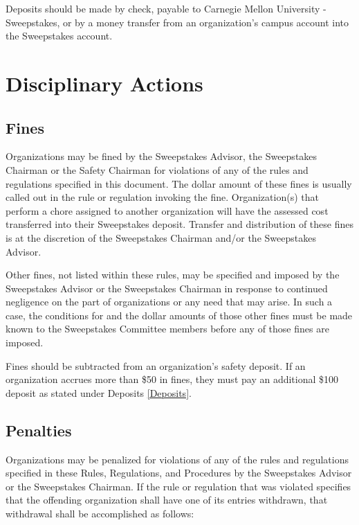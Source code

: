 	Deposits should be made by check, payable to Carnegie Mellon University - Sweepstakes, or by a money transfer from an organization's campus account into the Sweepstakes account.

\section{Disciplinary Actions}
\label{sec:DiciplinaryActions}

\subsection{Fines}

	Organizations may be fined by the Sweepstakes Advisor, the Sweepstakes Chairman or the Safety Chairman for violations of any of the rules and regulations specified in this document. The dollar amount of these fines is usually called out in the rule or regulation invoking the fine. Organization(s) that perform a chore assigned to another organization will have the assessed cost transferred into their Sweepstakes deposit. Transfer and distribution of these fines is at the discretion of the Sweepstakes Chairman and/or the Sweepstakes Advisor.

	Other fines, not listed within these rules, may be specified and imposed by the Sweepstakes Advisor or the Sweepstakes Chairman in response to continued negligence on the part of organizations or any need that may arise. In such a case, the conditions for and the dollar amounts of those other fines must be made known to the Sweepstakes Committee members before any of those fines are imposed.

	Fines should be subtracted from an organization's safety deposit. If an organization accrues more than \$50 in fines, they must pay an additional \$100 deposit as stated under Deposits \ref{Deposits}.

\subsection{Penalties}

	Organizations may be penalized for violations of any of the rules and regulations specified in these Rules, Regulations, and Procedures by the Sweepstakes Advisor or the Sweepstakes Chairman. If the rule or regulation that was violated specifies that the offending organization shall have one of its entries withdrawn, that withdrawal shall be accomplished as follows:

